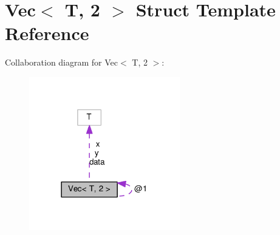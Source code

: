 \hypertarget{structVec_3_01T_00_012_01_4}{}\section{Vec$<$ T, 2 $>$ Struct Template Reference}
\label{structVec_3_01T_00_012_01_4}


Collaboration diagram for Vec$<$ T, 2 $>$\+:\nopagebreak
\begin{figure}[H]
\begin{center}
\leavevmode
\includegraphics[width=186pt]{structVec_3_01T_00_012_01_4__coll__graph}
\end{center}
\end{figure}
